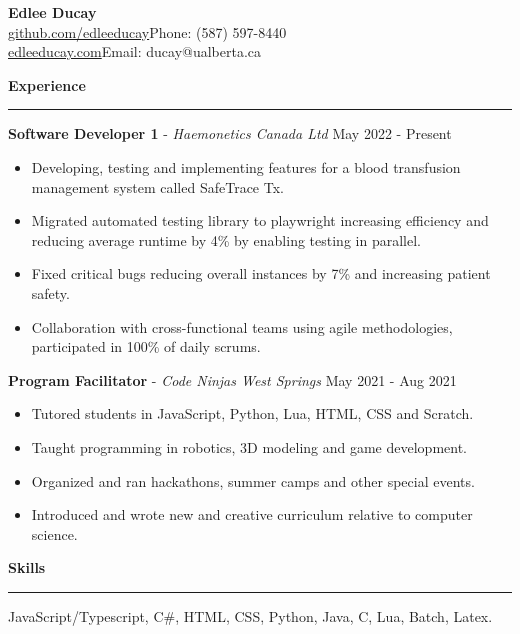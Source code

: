\documentclass{article}
\begin{document}
	
	\noindent \large \textbf{Edlee Ducay\\}
	\normalsize \small \href{https://github.com/EdleeDucay}{github.com/edleeducay}\hfill Phone: (587) 597-8440 \\
	\normalsize \small \href{https://edleeducay.com/}{edleeducay.com}\hfill Email: ducay@ualberta.ca

\vspace{1mm}
\noindent\textbf{Experience}
\vspace{1mm}
\hrule
\vspace{1mm}
\hfill\break
\noindent  \textbf{Software Developer 1} - \textit{Haemonetics Canada Ltd} \hfill May 2022 - Present
\begin{itemize}[noitemsep, nolistsep]
	\item {Developing, testing and implementing features for a blood transfusion management system called SafeTrace Tx.}
	\item {Migrated automated testing library to playwright increasing efficiency and reducing average runtime by 4\% by enabling testing in parallel.}
	\item {Fixed critical bugs reducing overall instances by 7\% and increasing patient safety.}
	\item {Collaboration with cross-functional teams using agile methodologies, participated in 100\% of daily scrums.}
\end{itemize}
\vspace{1mm}
\noindent  \textbf{Program Facilitator} - \textit{Code Ninjas West Springs} \hfill May 2021 - Aug 2021
\begin{itemize}[noitemsep, nolistsep]
	\item {Tutored students in JavaScript, Python, Lua, HTML, CSS and Scratch.}
	\item {Taught programming in robotics, 3D modeling and game development.}
	\item {Organized and ran hackathons, summer camps and other special events.}
	\item {Introduced and wrote new and creative curriculum relative to computer science.}
\end{itemize}
\vspace{2mm}
\noindent \textbf{Skills}
\vspace{1mm}
\hrule
\vspace{1mm}
\hfill\break
	 JavaScript/Typescript, C\#, HTML, CSS, Python, Java, C, Lua, Batch, Latex. \\
\end{document}
